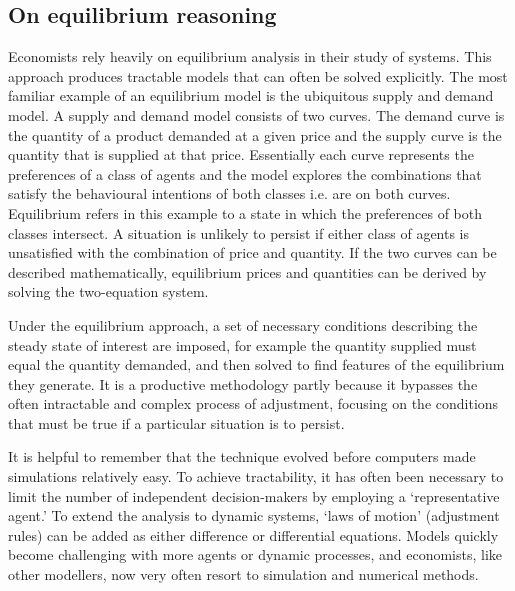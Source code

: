 \subsection{On equilibrium reasoning }
Economists rely heavily on equilibrium analysis in their study of systems. 
This approach produces tractable models that can often be solved explicitly. The most familiar example of an equilibrium model is the ubiquitous supply and demand model. A supply and demand model consists of two curves. The demand curve is the quantity of a product demanded at a given price and the supply curve is the quantity that is supplied at that price. Essentially each curve represents the preferences of a class of agents and the model explores the combinations that satisfy the behavioural intentions of both classes i.e. are on both curves. Equilibrium refers in this example to a state in which the preferences of both classes intersect. A situation is unlikely to persist if either class of agents is unsatisfied with the combination of price and quantity.  If the two curves can be described mathematically, equilibrium prices and quantities can be derived by solving the two-equation system.

Under the equilibrium approach, a set of necessary conditions describing the steady state of interest are imposed, for example the quantity supplied must equal the quantity demanded, and then solved to find features of the equilibrium they generate. It is a productive methodology partly because it bypasses the often intractable and complex process of adjustment, focusing on the conditions that must be true if a particular situation is to persist. 

It is helpful to remember that the technique evolved before computers made simulations relatively easy. To achieve tractability, it has often been necessary to limit the number of independent decision-makers by employing a `representative agent.' To extend the analysis to dynamic systems, `laws of motion' (adjustment rules) can be added as either difference or differential equations.  Models quickly become challenging with more agents or dynamic processes, and economists, like other modellers, now very often resort to simulation and numerical methods. 


